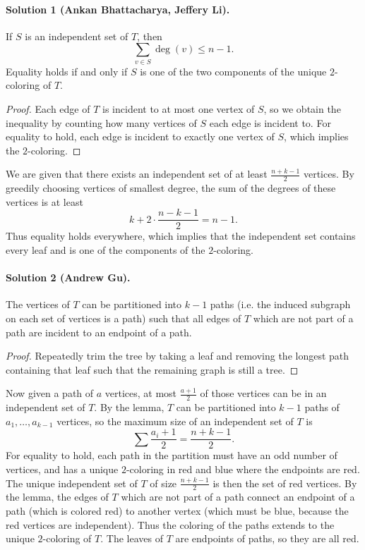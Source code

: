 \documentclass[11pt]{scrartcl}
\begin{document}
\paragraph{Solution 1 (Ankan Bhattacharya, Jeffery Li).}
\begin{lemma*}
  If $S$ is an independent set of $T$, then
  \[\sum_{v\in S}\deg(v)\leq n-1.\]
  Equality holds if and only if $S$ is one of the two components of the unique
  $2$-coloring of $T$.
\end{lemma*}

\begin{proof}
  Each edge of $T$ is incident to at most one vertex of $S$, so we obtain the
  inequality by counting how many vertices of $S$ each edge is incident to. For
  equality to hold, each edge is incident to exactly one vertex of $S$, which
  implies the $2$-coloring.
\end{proof}

We are given that there exists an independent set of at least $\frac{n+k-1}{2}$
vertices. By greedily choosing vertices of smallest degree, the sum of the
degrees of these vertices is at least
\[k+2\cdot\frac{n-k-1}{2}=n-1.\]
Thus equality holds everywhere, which implies that the independent set contains
every leaf and is one of the components of the $2$-coloring.

\paragraph{Solution 2 (Andrew Gu).}

\begin{lemma*}
  The vertices of $T$ can be partitioned into $k-1$ paths (i.e. the induced
  subgraph on each set of vertices is a path) such that all edges of $T$
  which are not part of a path are incident to an endpoint of a path.
\end{lemma*}

\begin{proof}
  Repeatedly trim the tree by taking a leaf and removing the longest path
  containing that leaf such that the remaining graph is still a tree.
\end{proof}

Now given a path of $a$ vertices, at most $\frac{a+1}{2}$ of those vertices can
be in an independent set of $T$. By the lemma, $T$ can be partitioned into $k-1$
paths of $a_1, \dots, a_{k-1}$ vertices, so the maximum size of an independent
set of $T$ is
\[\sum \frac{a_i+1}{2}=\frac{n+k-1}{2}.\]
For equality to hold, each path in the partition must have an odd number of
vertices, and has a unique $2$-coloring in red and blue where the endpoints are
red. The unique independent set of $T$ of size $\frac{n+k-1}{2}$ is then the set of red
vertices. By the lemma, the edges of $T$ which are not part of a path connect an
endpoint of a path (which is colored red) to another vertex (which must be blue,
because the red vertices are independent). Thus the coloring of the paths
extends to the unique $2$-coloring of $T$. The leaves of $T$ are endpoints of
paths, so they are all red.
\pagebreak
\end{document}
